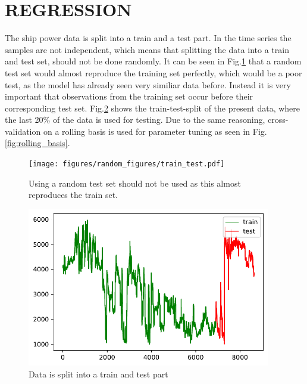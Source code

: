 \section*{REGRESSION}\label{regression}
The ship power data is split into a train and a test part. In the time
series the samples are not independent, which means that splitting the
data into a train and test set, should not be done randomly. It can be
seen in Fig.\ref{fig:random_train_test} that a random test set
would almost reproduce the training set perfectly, which would be a poor
test, as the model has already seen very similiar data before. Instead
it is very important that observations from the training set occur
before their corresponding test set. Fig.\ref{fig:train_test}
shows the train-test-split of the present data, where the last 20\% of
the data is used for testing. Due to the same reasoning,
cross-validation on a rolling basis is used for parameter tuning as seen
in Fig.\ref{fig:rolling_basis}.
\begin{figure}[H]
\begin{center}\texttt{[image: figures/random\_figures/train\_test.pdf]}\end{center}
\vspace{-0.7cm}
\caption{Using a random test set should not be used as this almost reproduces the train set.}
\label{fig:random_train_test}
\end{figure}
\begin{figure}[H]
\begin{center}\includegraphics[width = 0.95\textwidth]{figures/train_test.pdf}\end{center}
\vspace{-0.7cm}
\caption{Data is split into a train and test part}
\label{fig:train_test}
\end{figure}
